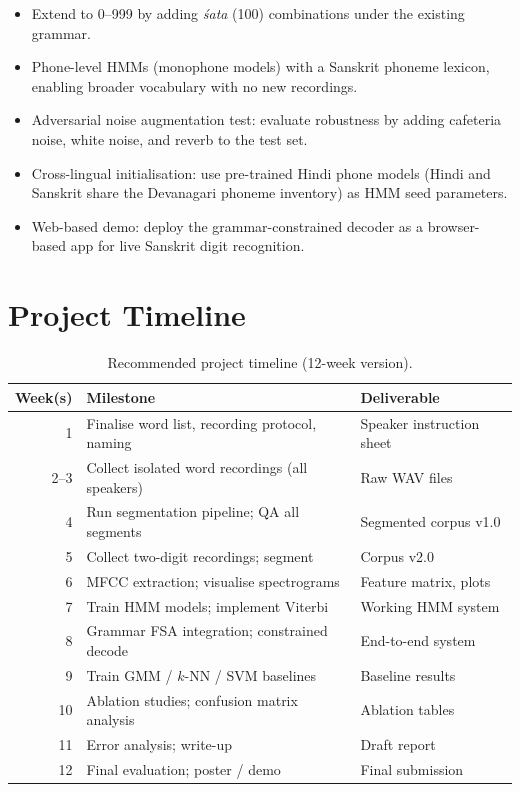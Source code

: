 \documentclass[12pt,a4paper]{article}
\begin{document}
\begin{itemize}[leftmargin=1.5em, itemsep=3pt]
  \item Extend to 0--999 by adding \textit{\'{s}ata} (100) combinations
        under the existing grammar.
  \item Phone-level HMMs (monophone models) with a Sanskrit phoneme lexicon,
        enabling broader vocabulary with no new recordings.
  \item Adversarial noise augmentation test: evaluate robustness by adding
        cafeteria noise, white noise, and reverb to the test set.
  \item Cross-lingual initialisation: use pre-trained Hindi phone models
        (Hindi and Sanskrit share the Devanagari phoneme inventory) as
        HMM seed parameters.
  \item Web-based demo: deploy the grammar-constrained decoder as a
        browser-based app for live Sanskrit digit recognition.
\end{itemize}

\section{Project Timeline}

\begin{table}[h!]
\centering
\caption{Recommended project timeline (12-week version).}
\label{tab:timeline}
\begin{tabular}{@{}rll@{}}
\toprule
\textbf{Week(s)} & \textbf{Milestone} & \textbf{Deliverable} \\
\midrule
1     & Finalise word list, recording protocol, naming & Speaker instruction sheet \\
2--3  & Collect isolated word recordings (all speakers) & Raw WAV files \\
4     & Run segmentation pipeline; QA all segments & Segmented corpus v1.0 \\
5     & Collect two-digit recordings; segment & Corpus v2.0 \\
6     & MFCC extraction; visualise spectrograms & Feature matrix, plots \\
7     & Train HMM models; implement Viterbi & Working HMM system \\
8     & Grammar FSA integration; constrained decode & End-to-end system \\
9     & Train GMM / $k$-NN / SVM baselines & Baseline results \\
10    & Ablation studies; confusion matrix analysis & Ablation tables \\
11    & Error analysis; write-up & Draft report \\
12    & Final evaluation; poster / demo & Final submission \\
\bottomrule
\end{tabular}
\end{table}
\end{document}
